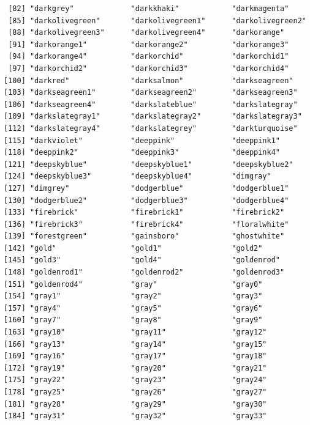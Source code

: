 \documentclass[a4paperpaper,]{article}
\theoremstyle{definition}
\theoremstyle{definition}
\theoremstyle{definition}
\theoremstyle{remark}
\begin{document}
\begin{verbatim}
 [82] "darkgrey"             "darkkhaki"            "darkmagenta"         
 [85] "darkolivegreen"       "darkolivegreen1"      "darkolivegreen2"     
 [88] "darkolivegreen3"      "darkolivegreen4"      "darkorange"          
 [91] "darkorange1"          "darkorange2"          "darkorange3"         
 [94] "darkorange4"          "darkorchid"           "darkorchid1"         
 [97] "darkorchid2"          "darkorchid3"          "darkorchid4"         
[100] "darkred"              "darksalmon"           "darkseagreen"        
[103] "darkseagreen1"        "darkseagreen2"        "darkseagreen3"       
[106] "darkseagreen4"        "darkslateblue"        "darkslategray"       
[109] "darkslategray1"       "darkslategray2"       "darkslategray3"      
[112] "darkslategray4"       "darkslategrey"        "darkturquoise"       
[115] "darkviolet"           "deeppink"             "deeppink1"           
[118] "deeppink2"            "deeppink3"            "deeppink4"           
[121] "deepskyblue"          "deepskyblue1"         "deepskyblue2"        
[124] "deepskyblue3"         "deepskyblue4"         "dimgray"             
[127] "dimgrey"              "dodgerblue"           "dodgerblue1"         
[130] "dodgerblue2"          "dodgerblue3"          "dodgerblue4"         
[133] "firebrick"            "firebrick1"           "firebrick2"          
[136] "firebrick3"           "firebrick4"           "floralwhite"         
[139] "forestgreen"          "gainsboro"            "ghostwhite"          
[142] "gold"                 "gold1"                "gold2"               
[145] "gold3"                "gold4"                "goldenrod"           
[148] "goldenrod1"           "goldenrod2"           "goldenrod3"          
[151] "goldenrod4"           "gray"                 "gray0"               
[154] "gray1"                "gray2"                "gray3"               
[157] "gray4"                "gray5"                "gray6"               
[160] "gray7"                "gray8"                "gray9"               
[163] "gray10"               "gray11"               "gray12"              
[166] "gray13"               "gray14"               "gray15"              
[169] "gray16"               "gray17"               "gray18"              
[172] "gray19"               "gray20"               "gray21"              
[175] "gray22"               "gray23"               "gray24"              
[178] "gray25"               "gray26"               "gray27"              
[181] "gray28"               "gray29"               "gray30"              
[184] "gray31"               "gray32"               "gray33"              

\end{verbatim}
\end{document}
